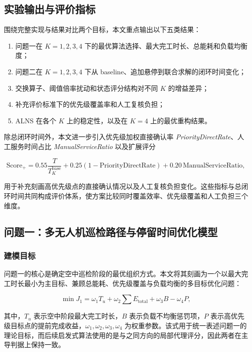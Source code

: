 \documentclass[12pt]{article}
\begin{document}
\subsection{实验输出与评价指标}
围绕完整实现与结果对比两个目标，本文重点输出以下五类结果：

\begin{enumerate}
	\item 问题一在 $K=1,2,3,4$ 下的最优算法选择、最大完工时长、总能耗和负载均衡度；
	\item 问题二在 $K=1,2,3,4$ 下从 baseline、追加悬停到联合求解的闭环时间变化；
	\item 交换算子、阈值倍率扰动和状态评分结构对不同 $K$ 的增益差异；
	\item 补充评价标准下的优先级覆盖率和人工复核负担；
	\item ALNS 在各个 $K$ 上的稳定性，以及在 $K=4$ 上的最优重构结果。
\end{enumerate}

除总闭环时间外，本文进一步引入优先级加权直接确认率 \textit{PriorityDirectRate}、人工服务时间占比 \textit{ManualServiceRatio} 以及扩展评分

\begin{equation}
\text{Score}_{+} = 0.55\frac{T}{T^{\text{base}}_K} + 0.25\left(1-\text{PriorityDirectRate}\right) + 0.20\,\text{ManualServiceRatio},
\end{equation}

用于补充刻画高优先级点的直接确认情况以及人工复核负担变化。这些指标与总闭环时间共同构成评价体系，使方案比较同时覆盖效率、优先级覆盖和人工负担三个维度。

\subsection{问题一：多无人机巡检路径与停留时间优化模型}

\subsubsection{建模目标}
问题一的核心是确定空中巡检阶段的最优组织方式。本文将其刻画为一个以最大完工时长最小为主目标、兼顾总能耗、优先级覆盖与负载均衡的多目标优化问题：

\begin{equation}
\min J_1 = \omega_1 T_u + \omega_2 \sum E_{\text{total}} + \omega_3 B - \omega_4 P,
\end{equation}

其中，$T_u$ 表示空中阶段最大完工时长，$B$ 表示负载不均衡惩罚项，$P$ 表示高优先级目标点的提前完成收益，$\omega_1,\omega_2,\omega_3,\omega_4$ 为权重参数。该式用于统一表述问题一的理论目标，而后续启发式算法使用的是与之同方向的局部代理评分，因此两者在主导判据上保持一致。
\end{document}
